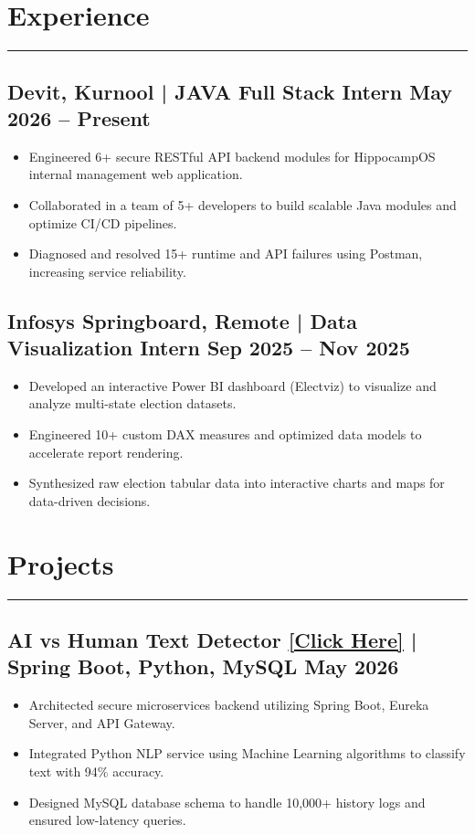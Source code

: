 \documentclass[9pt, a4paper]{extarticle}
\begin{document}
\section*{Experience}
\vspace{0pt}
\hrule
\vspace{2pt}
\subsection*{Devit, Kurnool | JAVA Full Stack Intern \hfill May 2026 -- Present}
\begin{itemize}
\item Engineered 6+ secure RESTful API backend modules for HippocampOS internal management web application.
\item Collaborated in a team of 5+ developers to build scalable Java modules and optimize CI/CD pipelines.
\item Diagnosed and resolved 15+ runtime and API failures using Postman, increasing service reliability.
\end{itemize} 
\subsection*{Infosys Springboard, Remote | Data Visualization Intern \hfill Sep 2025 -- Nov 2025}
\begin{itemize}
\item Developed an interactive Power BI dashboard (Electviz) to visualize and analyze multi-state election datasets.
\item Engineered 10+ custom DAX measures and optimized data models to accelerate report rendering.
\item Synthesized raw election tabular data into interactive charts and maps for data-driven decisions.
\end{itemize}
\vspace{2pt}

\section*{Projects}
\vspace{0pt}
\hrule
\vspace{2pt}
\subsection*{AI vs Human Text Detector \href{https://github.com/vishnu99617/ai-vs-human-detector}{\small\normalfont\underline{[Click Here]}} | Spring Boot, Python, MySQL \hfill May 2026}
\begin{itemize}
\item Architected secure microservices backend utilizing Spring Boot, Eureka Server, and API Gateway.
\item Integrated Python NLP service using Machine Learning algorithms to classify text with 94\% accuracy.
\item Designed MySQL database schema to handle 10,000+ history logs and ensured low-latency queries.
\end{itemize}
\end{document}
